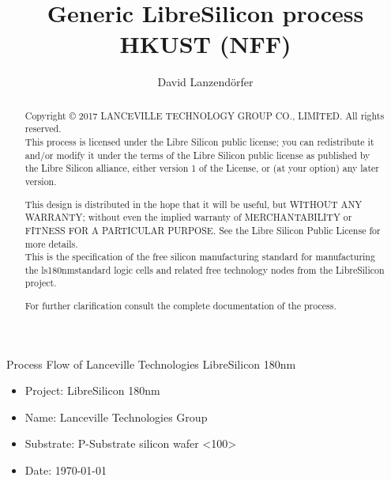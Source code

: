 \documentclass[a4paper,landscape]{article}
\author{David Lanzendörfer}
\title{Generic LibreSilicon process HKUST (NFF)}
\begin{document}
\maketitle

\begin{abstract}
	Copyright © 2017 LANCEVILLE TECHNOLOGY GROUP CO., LIMITED. All rights reserved. \\

	This process is licensed under the Libre Silicon public license; you can redistribute it and/or modify it under the terms of the Libre Silicon public license
	as published by the Libre Silicon alliance, either version 1 of the License, or (at your option) any later version.

	This design is distributed in the hope that it will be useful, but WITHOUT ANY WARRANTY; without even the implied warranty of MERCHANTABILITY or FITNESS FOR A PARTICULAR PURPOSE.
	See the Libre Silicon Public License for more details. \\

	This is the specification of the free silicon manufacturing standard for manufacturing the ls180nm\footnotemark standard logic cells and related free technology nodes from the LibreSilicon project.
	
	For further clarification consult the complete documentation of the process.

\end{abstract}
\vfill
\newpage

Process Flow of Lanceville Technologies LibreSilicon 180nm

\begin{itemize}
	\item Project: LibreSilicon 180nm
	\item Name: Lanceville Technologies Group
	\item Substrate: P-Substrate silicon wafer <100>
	\item Date: \today
\end{itemize}
\end{document}
